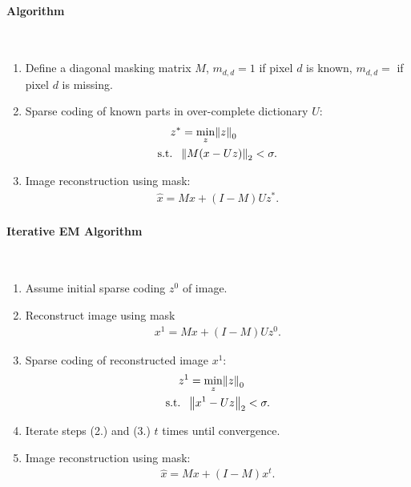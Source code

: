 \paragraph{Algorithm} $\ $
\begin{enumerate}
    \item Define a diagonal masking matrix $M$, $m_{d,d} = 1$ if pixel $d$ is known, $m_{d,d} = $ if pixel $d$ is missing.
    \item Sparse coding of known parts in over-complete dictionary $U$:
    \begin{align*}
        z^* &= \min_z \norm{z}_0\\
        \text{s.t. }\ &\norm{M(x-Uz)}_2 < \sigma.
    \end{align*}
    \item Image reconstruction using mask:
    \begin{align*}
        \hat x = Mx + (I-M)Uz^*.
    \end{align*}
\end{enumerate}
\paragraph{Iterative EM Algorithm} $\ $
\begin{enumerate}
\item Assume initial sparse coding $z^0$ of image.
\item Reconstruct image using mask
\begin{align*}
    x^1 = Mx + (I-M)Uz^0.
\end{align*}
\item Sparse coding of reconstructed image $x^1$:
    \begin{align*}
        z^1 &= \min_z \norm{z}_0\\
        \text{s.t. }\ &\norm{x^1-Uz}_2 <\sigma.
    \end{align*}
\item Iterate steps (2.) and (3.) $t$ times until convergence.
\item Image reconstruction using mask:
    \begin{align*}
        \hat x = Mx + (I-M)x^t.
    \end{align*}
\end{enumerate}

